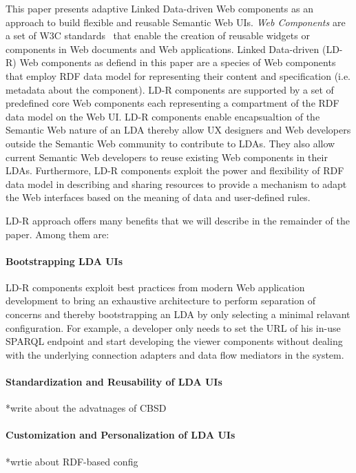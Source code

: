 \documentclass{acm_proc_article-sp}
\begin{document}
This paper presents adaptive Linked Data-driven Web components as an approach to build flexible and reusable Semantic Web UIs.
\emph{Web Components} are a set of W3C standards~\cite{webcomponentsW3C} that enable the creation of reusable widgets or components in Web documents and Web applications.
Linked Data-driven (LD-R) Web components as defiend in this paper are a species of Web components that employ RDF data model for representing their content and specification (i.e. metadata about the component).
LD-R components are supported by a set of predefined core Web components each representing a compartment of the RDF data model on the Web UI.
LD-R components enable encapsualtion of the Semantic Web nature of an LDA thereby allow UX designers and Web developers outside the Semantic Web community to contribute to LDAs.
They also allow current Semantic Web developers to reuse existing Web components in their LDAs.
Furthermore, LD-R components exploit the power and flexibility of RDF data model in describing and sharing resources to provide a mechanism to adapt the Web interfaces based on the meaning of data and user-defined rules.


LD-R approach offers many benefits that we will describe in the remainder of the paper. Among them are:

\paragraph{Bootstrapping LDA UIs} 
LD-R components exploit best practices from modern Web application development to bring an exhaustive architecture to perform separation of concerns and thereby bootstrapping an LDA by only selecting a minimal relavant configuration.
For example, a developer only needs to set the URL of his in-use SPARQL endpoint and start developing the viewer components without dealing with the underlying connection adapters and data flow mediators in the system.

\paragraph{Standardization and Reusability of LDA UIs} 
*write about the advatnages of CBSD

\paragraph{Customization and Personalization of LDA UIs} 
*wrtie about RDF-based config
\end{document}
